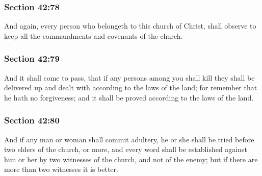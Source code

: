 	\subsubsection{Section 42:78} %
		\label{DC42-78}

		And again, every person who belongeth to this church of Christ, shall observe to keep all the commandments and covenants of the church.


	\subsubsection{Section 42:79} %
		\label{DC42-79}

		And it shall come to pass, that if any persons among you shall kill they shall be delivered up and dealt with according to the laws of the land; for remember that he hath no forgiveness; and it shall be proved according to the laws of the land.


	\subsubsection{Section 42:80} %
		\label{DC42-80}

		And if any man or woman shall commit adultery, he or she shall be tried before two elders of the church, or more, and every word shall be established against him or her by two witnesses of the church, and not of the enemy; but if there are more than two witnesses it is better.


